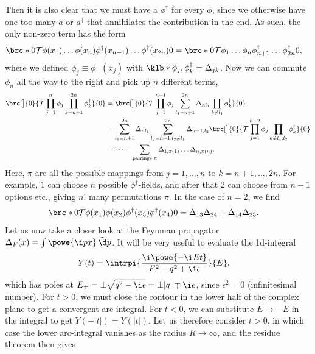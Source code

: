 \documentclass[english, parskip=full]{scrbook}
\begin{document}
{Then it is also clear that we must have a $\phi^\dagger$ for every $\phi$, since we otherwise have one too many $a$ or $a^\dagger$ that annihilates the contribution in the end.
As such, the only non-zero term has the form
\begin{align}
\brc*{0}{\mathcal{T} \phi(x_1)\dots \phi(x_n)\phi^\dagger(x_{n+1}) \dots\phi^\dagger(x_{2n})}{0} &= \brc*{0}{\mathcal{T} \phi_1\dots \phi_n\phi^\dagger_{n+1} \dots\phi^\dagger_{2n}}{0},
\end{align}
where we defined $\phi_j \equiv \phi_-(x_j)$ with $\klb*{\phi_j,\phi^\dagger_k}= \Delta_{jk}$.
Now we can commute $\phi_n$ all the way to the right and pick up $n$ different terms,
\begin{align}
\brc[\big]{0}{\mathcal{T} \prod_{j=1}^n \phi_j \prod_{k=n+1}^{2n} \phi^\dagger_k}{0} &= \brc[\big]{0}{\mathcal{T} \prod_{j=1}^{n-1} \phi_j \sum_{l_1=n+1}^{2n} \Delta_{nl_1} \prod_{k\neq l_1} \phi^\dagger_k}{0}\\
&= \sum_{l_1=n+1}^{2n} \Delta_{nl_1} \sum_{l_2=n+1,l_2\neq l_1}^{2n} \Delta_{n-1,l_2} \brc[\big]{0}{\mathcal{T} \prod_{j=1}^{n-2} \phi_j \prod_{k\neq l_1,l_2} \phi^\dagger_k}{0}\\
&= \dots = \sum_{\text{pairings }\pi} \Delta_{1,\pi(1)} \dots \Delta_{n,\pi(n)}.
\end{align}
Here, $\pi$ are all the possible mappings from $j=1,\dots,n$ to $k=n+1,\dots,2n$.
For example, $1$ can choose $n$ possible $\phi^\dagger$-fields, and after that $2$ can choose from $n-1$ options etc., giving $n!$ many permutations $\pi$.
In the case of $n=2$, we find
\begin{align}
\brc*{0}{\mathcal{T} \phi(x_1)\phi(x_2)\phi^\dagger(x_3) \phi^\dagger(x_4)}{0} &= \Delta_{13}\Delta_{24} + \Delta_{14}\Delta_{23}.
\end{align}
}
Let us now take a closer look at the Feynman propagator $\Delta_F(x) = \int \powe{\i px}\,\tilde{\d}p$.
It will be very useful to evaluate the 1d-integral
\begin{align}
Y(t) &= \intrpi{\frac{\i\powe{-\i Et}}{E^2 - q^2 + \i\epsilon}}{E},
\end{align}
which has poles at $E_\pm=\pm \sqrt{q^2 -\i\epsilon} = \pm |q| \mp \i\epsilon$, since $\epsilon^2=0$ (infinitesimal number).
For $t>0$, we must close the contour in the lower half of the complex plane to get a convergent arc-integral.
For $t<0$, we can substitute $E\rightarrow -E$ in the integral to get $Y(-|t|) = Y(|t|)$.
Let us therefore consider $t>0$, in which case the lower arc-integral vanishes as the radius $R\rightarrow\infty$, and the residue theorem then gives
\end{document}
